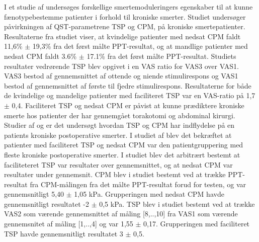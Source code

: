 I et studie af  undersøges forskellige smertemoduleringers egenskaber til at kunne fænotypebestemme patienter i forhold til kroniske smerter. Studiet undersøger påvirkningen af QST-parametrene TSP og CPM, på kroniske smertepatienter. Resultaterne fra studiet viser, at kvindelige patienter med nedsat CPM faldt 11,6\% $\pm$ 19,3\% fra det først målte PPT-resultat, og at mandlige patienter med nedsat CPM faldt 3.6\% $\pm$ 17.1\% fra det først målte PPT-resultat. Studiets resultater vedrørende TSP blev opgivet i en VAS ratio for VAS3 over VAS1. VAS3 bestod af gennemsnittet af ottende og niende stimulirespons og VAS1 bestod af gennemsnittet af første til fjedre stimulirespons. Resultaterne for både de kvindelige og mandelige patienter med faciliteret TSP var en VAS-ratio på 1,7 $\pm$ 0,4. Faciliteret TSP og nedsat CPM er påvist at kunne prædiktere kroniske smerte hos patienter der har gennemgået torakotomi og abdominal kirurgi. \citep{Vaegter2016} \\
Studier af  og  er det undersøgt hvordan TSP og CPM har indflydelse på en patients kroniske postoperative smerter. I studiet af  blev det bekræftet at patienter med faciliteret TSP og nedsat CPM var den patientgruppering med fleste kroniske postoperative smerter. I studiet blev det arbitrært bestemt at faciliteteret TSP var resultater over gennemsnittet, og at nedsat CPM var resultater under gennemsnit. CPM blev i studiet bestemt ved at trække PPT-resultat fra CPM-målingen fra det målte PPT-resultat forud for testen, og var gennemsnitligt 5,40 $\pm$ 1,05 kPa. Grupperingen med nedsat CPM havde gennemsnitligt resultatet -2 $\pm$ 0,5 kPa. TSP blev i studiet bestemt ved at trække VAS2 som værende gennemsnittet af måling [8,..,10] fra VAS1 som værende gennemsnitet af måling [1,..,4] og var 1,55 $\pm$ 0,17. Grupperingen med faciliteret TSP havde gennemsnitligt resultatet 3 $\pm$ 0,5. 

\begin{table}[H]
	\centering
	\caption{I tabellen ses resultaterne vedrørende CPM og TSP målinger på gruppering med nedsat CPM og faciliteret TSP.}
	\label{tab:CPM_TSP}
\end{table}

